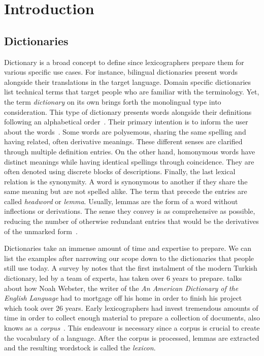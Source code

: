 \chapter{Introduction}\label{chap:introduction}%
\section{Dictionaries}%
\label{sec:dictionaries}
Dictionary is a broad concept to define since lexicographers prepare them for various specific use cases.
For instance, bilingual dictionaries present words alongside their translations in the target language.
Domain specific dictionaries list technical terms that target people who are familiar with the terminology.
Yet, the term \emph{dictionary} on its own brings forth the monolingual type into consideration.
This type of dictionary presents words alongside their definitions following an alphabetical order~\cite{sterkenburg_practical_2003}.
Their primary intention is to inform the user about the words~\cite{uzun_modern_2005}.
Some words are polysemous, sharing the same spelling and having related, often derivative meanings.
These different senses are clarified through multiple definition entries.
On the other hand, homonymous words have distinct meanings while having identical spellings through coincidence.
They are often denoted using discrete blocks of descriptions.
Finally, the last lexical relation is the synonymity.
A word is synonymous to another if they share the same meaning but are not spelled alike.
The term that precede the entries are called \emph{headword} or \emph{lemma}.
Usually, lemmas are the form of a word without inflections or derivations.
The sense they convey is as comprehensive as possible, reducing the number of otherwise redundant entries that would be the derivatives of the unmarked form~\cite{ibrahim_usta_turkce_2006}.

Dictionaries take an immense amount of time and expertise to prepare.
We can list the examples after narrowing our scope down to the dictionaries that people still use today.
A survey by \textcite{uzun_1945ten_1999} notes that the first instalment of the modern Turkish dictionary, led by a team of experts, has taken over 6 years to prepare.
\textcite{kendall_forgotten_2011} talks about how Noah Webster, the writer of the \emph{An American Dictionary of the English Language} had to mortgage off his home in order to finish his project which took over 26 years.
Early lexicographers had invest tremendous amounts of time in order to collect enough material to prepare a collection of documents, also knows as a \emph{corpus}~\cite{uzun_1945ten_1999}.
This endeavour is necessary since a corpus is crucial to create the vocabulary of a language.
After the corpus is processed, lemmas are extracted and the resulting wordstock is called the \emph{lexicon}.

